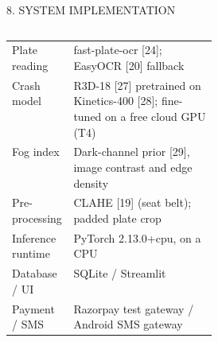 \documentclass[aspectratio=169,10pt,t]{beamer}
\begin{document}
\begin{frame}{8. SYSTEM IMPLEMENTATION}
\begin{columns}[T,onlytextwidth]
\begin{column}{0.55\textwidth}
\begin{tabularx}{\linewidth}{@{}L{0.3\linewidth}Y@{}}
Plate reading        & fast-plate-ocr [24]; EasyOCR [20] fallback\\
Crash model          & R3D-18 [27] pretrained on Kinetics-400 [28]; fine-tuned on a free cloud GPU (T4)\\
Fog index            & Dark-channel prior [29], image contrast and edge density\\
Pre-processing       & CLAHE [19] (seat belt); padded plate crop\\
Inference runtime    & PyTorch 2.13.0+cpu, on a CPU\\
Database / UI        & SQLite / Streamlit\\
Payment / SMS        & Razorpay test gateway / Android SMS gateway\\
\bottomrule
\end{tabularx}
\end{column}
\end{columns}
\end{frame}
\end{document}
